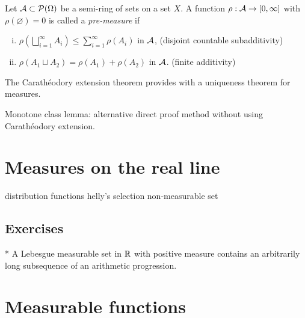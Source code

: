 \documentclass{../note}
\begin{document}
\begin{prb}
Let $\mathcal{A}\subset\mathcal{P}(\Omega)$ be a semi-ring of sets on a set $X$.
A function $\rho:\mathcal{A}\to[0,\infty]$ with $\rho(\varnothing)=0$ is called a \emph{pre-measure} if
\begin{enumerate}[(i)]
\item $\rho(\bigsqcup_{i=1}^\infty A_i)\le\sum_{i=1}^\infty\rho(A_i)$ in $\mathcal{A}$,
\hfill(disjoint countable subadditivity)
\item $\rho(A_1\sqcup A_2)=\rho(A_1)+\rho(A_2)$ in $\mathcal{A}$.
\hfill(finite additivity)
\end{enumerate}
\begin{parts}
\item 
\end{parts}
\end{prb}



\begin{prb}
The Carath\'eodory extension theorem provides with a uniqueness theorem for measures.
\end{prb}



Monotone class lemma: alternative direct proof method without using Carath\'eodory extension.


\chapter{Measures on the real line}

distribution functions
helly's selection
non-measurable set


\section*{Exercises}
\begin{prb}*
A Lebesgue measurable set in $\mathbb{R}$ with positive measure contains an arbitrarily long subsequence of an arithmetic progression.
\end{prb}

















\chapter{Measurable functions}
\end{document}
